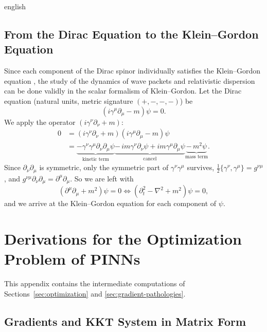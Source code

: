 \documentclass[12pt,letterpaper,twoside]{book}
\begin{document}
\begin{hyphenrules}{english}
\section{From the Dirac Equation to the Klein--Gordon Equation}\label{app:dirac}

Since each component of the Dirac spinor individually satisfies the Klein--Gordon equation
\cite{bjorken1964}, the study of the dynamics of wave packets and relativistic dispersion can be done
validly in the scalar formalism of Klein--Gordon. Let the Dirac equation (natural units, metric signature
$(+,-,-,-)$) be
\begin{equation}
  (i\gamma^{\mu}\partial_\mu-m)\psi=0.
  \label{eq:dirac}
\end{equation}
We apply the operator $(i\gamma^{\nu}\partial_\nu+m)$:
\begin{align*}
  0&=(i\gamma^{\nu}\partial_\nu+m)(i\gamma^{\mu}\partial_\mu-m)\psi\\
   &=\underbrace{-\gamma^{\nu}\gamma^{\mu}\partial_\nu\partial_\mu\psi}_{\text{kinetic term}}
     \underbrace{-\,i m\gamma^{\nu}\partial_\nu\psi+i m\gamma^{\mu}\partial_\mu\psi}_{\text{cancel}}
     \underbrace{-\,m^2\psi}_{\text{mass term}}.
\end{align*}
Since $\partial_\nu\partial_\mu$ is symmetric, only the symmetric part of $\gamma^{\nu}\gamma^{\mu}$ survives,
$\frac12\{\gamma^{\nu},\gamma^{\mu}\}=g^{\nu\mu}$, and $g^{\nu\mu}\partial_\nu\partial_\mu=\partial^{\mu}\partial_\mu$.
So we are left with
\[
  (\partial^{\mu}\partial_\mu+m^2)\psi=0\iff(\partial_t^2-\nabla^2+m^2)\psi=0,
\]
and we arrive at the Klein--Gordon equation for each component of $\psi$.

\chapter{Derivations for the Optimization Problem of PINNs}\label{app:optimization}

This appendix contains the intermediate computations of Sections~\ref{sec:optimization} and
\ref{sec:gradient-pathologies}.

\section{Gradients and KKT System in Matrix Form}\label{app-sec:kkt-gradients}


\end{hyphenrules}
\end{document}
